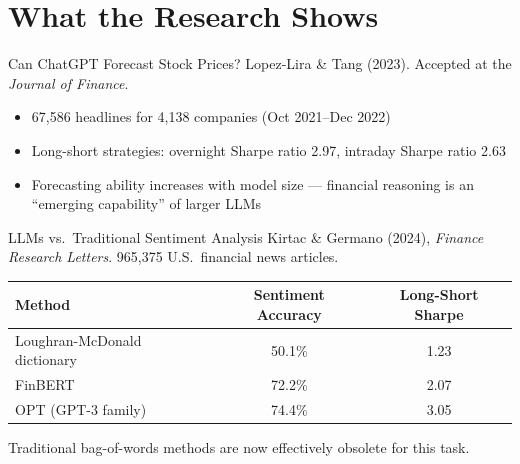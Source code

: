 \documentclass[aspectratio=169]{beamer}
\begin{document}
\section{What the Research Shows}

\begin{frame}{Can ChatGPT Forecast Stock Prices?}
Lopez-Lira \& Tang (2023). Accepted at the \textit{Journal of Finance}.
\vspace{0.3cm}
\begin{itemize}
  \item 67,586 headlines for 4,138 companies (Oct 2021--Dec 2022)
  \item Long-short strategies: overnight \alert{Sharpe ratio 2.97}, intraday \alert{Sharpe ratio 2.63}
  \item Forecasting ability \alert{increases with model size} --- financial reasoning is an ``emerging capability'' of larger LLMs
\end{itemize}
\end{frame}

\begin{frame}{LLMs vs.\ Traditional Sentiment Analysis}
Kirtac \& Germano (2024), \textit{Finance Research Letters}. 965,375 U.S.\ financial news articles.
\vspace{0.3cm}
\begin{center}
\small
\begin{tabular}{@{} l c c @{}}
\toprule
\textbf{Method} & \textbf{Sentiment Accuracy} & \textbf{Long-Short Sharpe} \\
\midrule
Loughran-McDonald dictionary & 50.1\% & 1.23 \\
FinBERT & 72.2\% & 2.07 \\
OPT (GPT-3 family) & \alert{74.4\%} & \alert{3.05} \\
\bottomrule
\end{tabular}
\end{center}
\vspace{0.3cm}
Traditional bag-of-words methods are now \alert{effectively obsolete} for this task.
\end{frame}
\end{document}
